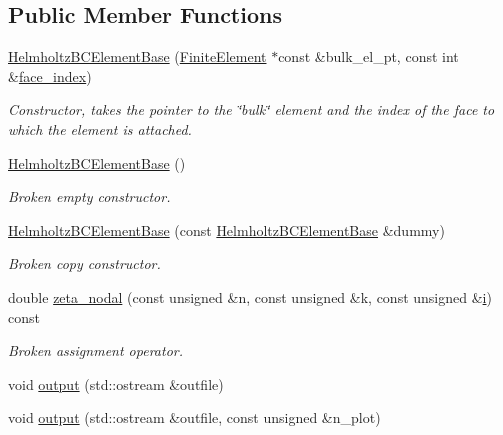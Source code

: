 \subsection*{Public Member Functions}
\begin{DoxyCompactItemize}
\item 
\hyperlink{classoomph_1_1HelmholtzBCElementBase_a3d3dae6a01616db735b2624f5a06bdd5}{Helmholtz\+B\+C\+Element\+Base} (\hyperlink{classoomph_1_1FiniteElement}{Finite\+Element} $\ast$const \&bulk\+\_\+el\+\_\+pt, const int \&\hyperlink{classoomph_1_1FaceElement_a478d577ac6db67ecc80f1f02ae3ab170}{face\+\_\+index})
\begin{DoxyCompactList}\small\item\em Constructor, takes the pointer to the \char`\"{}bulk\char`\"{} element and the index of the face to which the element is attached. \end{DoxyCompactList}\item 
\hyperlink{classoomph_1_1HelmholtzBCElementBase_a5d421cc79d20936a49dea012ef38077a}{Helmholtz\+B\+C\+Element\+Base} ()
\begin{DoxyCompactList}\small\item\em Broken empty constructor. \end{DoxyCompactList}\item 
\hyperlink{classoomph_1_1HelmholtzBCElementBase_a29f6e4cfef6066d637f0eea0e2253075}{Helmholtz\+B\+C\+Element\+Base} (const \hyperlink{classoomph_1_1HelmholtzBCElementBase}{Helmholtz\+B\+C\+Element\+Base} \&dummy)
\begin{DoxyCompactList}\small\item\em Broken copy constructor. \end{DoxyCompactList}\item 
double \hyperlink{classoomph_1_1HelmholtzBCElementBase_a66defe3dfc1150d37015c43c08fd93b1}{zeta\+\_\+nodal} (const unsigned \&n, const unsigned \&k, const unsigned \&\hyperlink{cfortran_8h_adb50e893b86b3e55e751a42eab3cba82}{i}) const
\begin{DoxyCompactList}\small\item\em Broken assignment operator. \end{DoxyCompactList}\item 
void \hyperlink{classoomph_1_1HelmholtzBCElementBase_a7337e98fa91e804f02d2d1642b01977b}{output} (std\+::ostream \&outfile)
\item 
void \hyperlink{classoomph_1_1HelmholtzBCElementBase_a10eda724d26f4b2e10b914cba57c8339}{output} (std\+::ostream \&outfile, const unsigned \&n\+\_\+plot)

\end{DoxyCompactItemize}
